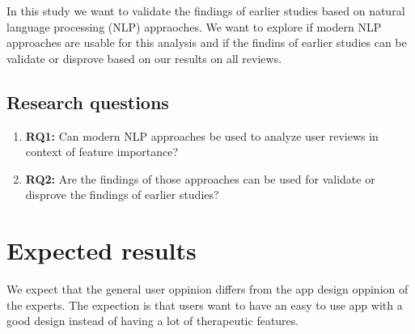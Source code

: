 In this study we want to validate the findings of earlier studies based on natural language processing (NLP) appraoches.
We want to explore if modern NLP approaches are usable for this analysis and
if the findins of earlier studies can be validate or disprove based on our results on all reviews.
\subsection{Research questions}
\label{sec:research-questions}
\begin{enumerate}
\item \textbf{RQ1:} Can modern NLP approaches be used to analyze user reviews in context of feature importance?
\item \textbf{RQ2:} Are the findings of those approaches can be used for validate or disprove the findings of earlier studies?
\end{enumerate}


\section{Expected results}
\label{sec:expected-results}
We expect that the general user oppinion differs from the app design oppinion of the experts. 
The expection is that users want to have an easy to use app with a good design instead of having a lot of therapeutic features.





